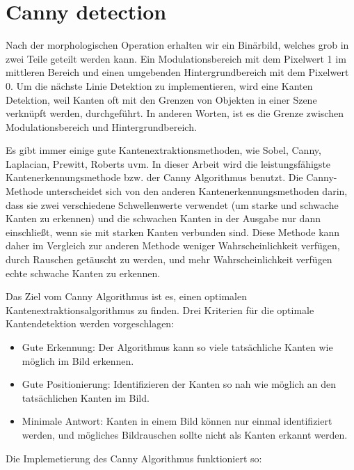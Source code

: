 \section{Canny detection}

Nach der morphologischen Operation erhalten wir ein Binärbild, welches grob in zwei Teile geteilt werden kann. Ein Modulationsbereich mit dem Pixelwert 1 im mittleren Bereich und einen umgebenden Hintergrundbereich mit dem Pixelwert 0. Um die nächste Linie Detektion zu implementieren, wird eine Kanten Detektion, weil Kanten oft mit den Grenzen von Objekten in einer Szene verknüpft werden, durchgeführt. In anderen Worten, ist es die Grenze zwischen Modulationsbereich und Hintergrundbereich. \cite{canny}

Es gibt immer einige gute Kantenextraktionsmethoden, wie Sobel, Canny, Laplacian, Prewitt, Roberts uvm. In dieser Arbeit wird die leistungsfähigste Kantenerkennungsmethode bzw. der Canny Algorithmus benutzt. Die Canny-Methode unterscheidet sich von den anderen Kantenerkennungsmethoden darin, dass sie zwei verschiedene Schwellenwerte verwendet (um starke und schwache Kanten zu erkennen) und die schwachen Kanten in der Ausgabe nur dann einschließt, wenn sie mit starken Kanten verbunden sind. Diese Methode kann daher im Vergleich zur anderen Methode weniger Wahrscheinlichkeit verfügen, durch Rauschen getäuscht zu werden, und mehr Wahrscheinlichkeit verfügen echte schwache Kanten zu erkennen.

Das Ziel vom Canny Algorithmus ist es, einen optimalen Kantenextraktionsalgorithmus zu finden. Drei Kriterien für die optimale Kantendetektion werden vorgeschlagen:

\begin{itemize}

\item Gute Erkennung: Der Algorithmus kann so viele tatsächliche Kanten wie möglich im Bild erkennen.
\item Gute Positionierung: Identifizieren der Kanten so nah wie möglich an den tatsächlichen Kanten im Bild.
\item Minimale Antwort: Kanten in einem Bild können nur einmal identifiziert werden, und mögliches Bildrauschen sollte nicht als Kanten erkannt werden.

\end{itemize}

Die Implemetierung des Canny Algorithmus funktioniert so:

